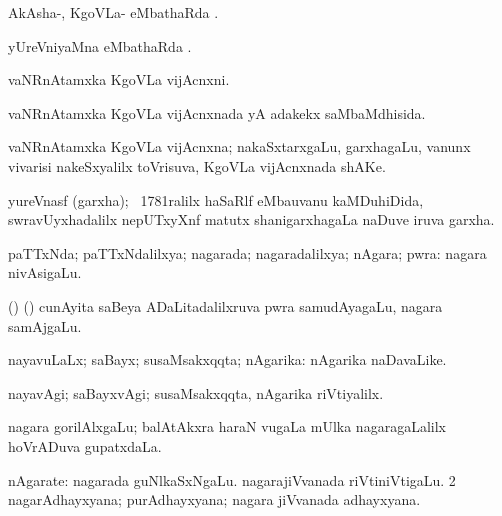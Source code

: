 {{\bentry
{} 
\gl{\sapUpa}
\expl{}
\bmng
AkAsha-, KgoVLa- eMbathaRda \sapUpa. 
\emng
\eentry

\bentry
{} 
\gl{\sapUpa}
\expl{}
\bmng
yUreVniyaMna eMbathaRda \sapUpa. 
\emng
\eentry

\bentry
{} 
\gl{\nA}
\expl{}
\bmng
vaNRnAtamxka KgoVLa vijAcnxni. 
\emng
\eentry

\bentry
{} 
\gl{\gu}
\expl{}
\bmng
vaNRnAtamxka KgoVLa vijAcnxnada yA adakekx saMbaMdhisida. 
\emng
\eentry

\bentry
{} 
\gl{\nA}
\expl{}
\bmng
vaNRnAtamxka KgoVLa vijAcnxna; nakaSxtarxgaLu, garxhagaLu, \mo vanunx vivarisi nakeSxyalilx toVrisuva, KgoVLa vijAcnxnada shAKe. 
\emng
\eentry

\bentry
{} 
\gl{\nA}
\expl{}
\bmng
yureVnasf (garxha); \kirxsha\ 1781ralilx haSaRlf eMbauvanu kaMDuhiDida, swravUyxhadalilx nepUTxyXnf matutx shanigarxhagaLa naDuve iruva garxha. 
\emng
\eentry

\bentry
{} 
\gl{\gu}
\expl{}
\bmng
paTTxNda; paTTxNdalilxya; nagarada; nagaradalilxya; nAgara; pwra:  nagara nivAsigaLu. 
\emng
\eentry

\bentry
{}
\gl{\nA}
\expl{}
\bmng
(\birx) (\ca) cunAyita saBeya ADaLitadalilxruva pwra samudAyagaLu, nagara samAjgaLu. 
\emng
\eentry

\bentry
{} 
\gl{\gu}
\bmng
nayavuLaLx; saBayx; susaMsakxqqta; nAgarika:  nAgarika naDavaLike. 
\emng
\eentry

\bentry
{} 
\gl{\kirxvi}
\expl{}
\bmng
nayavAgi; saBayxvAgi; susaMsakxqqta, nAgarika riVtiyalilx. 
\emng
\eentry

\bentry
{}
\gl{\nA}
\expl{}
\bmng
nagara gorilAlxgaLu; balAtAkxra haraN \mo vugaLa mUlka nagaragaLalilx hoVrADuva gupatxdaLa. 
\emng
\eentry

\bentry
{} 
\gl{\sakirx}
\expl{}
\bmng
{} 
\emng
\eentry

\bentry
{} 
\gl{\nA}
\expl{}
\bmng
\bnum
{} nAgarate: 
\banum
{} nagarada guNlkaSxNgaLu. 
 nagarajiVvanada riVtiniVtigaLu. 
\eanum
\numie
\num{2} nagarAdhayxyana; purAdhayxyana; nagara jiVvanada adhayxyana. 
\enum
\emng
\eentry

}}
